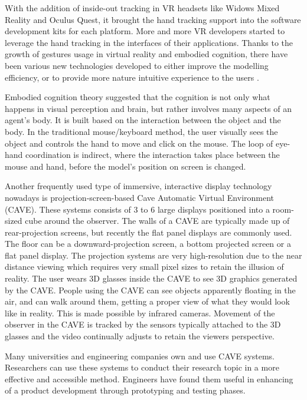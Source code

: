 With the addition of inside-out tracking in VR headsets like Widows Mixed Reality and Oculus Quest, it brought the hand tracking support into the software development kits for each platform. More and more VR developers started to leverage the hand tracking in the interfaces of their applications. Thanks to the growth of gestures usage in virtual reality and embodied cognition, there have been various new technologies developed to either improve the modelling efficiency, or to provide more nature intuitive experience to the users \citep{dangetiComparingBarehandinairGesture2016}.

Embodied cognition theory suggested that the cognition is not only what happens in visual perception and brain, but rather involves many aspects of an agent’s body. It is built based on the interaction between the object and the body. In the traditional mouse/keyboard method, the user visually sees the object and controls the hand to move and click on the mouse. The loop of eye-hand coordination is indirect, where the interaction takes place between the mouse and hand, before the model’s position on screen is changed.

Another frequently used type of immersive, interactive display technology nowadays is projection-screen-based Cave Automatic Virtual Environment (CAVE). These systems consists of 3 to 6 large displays positioned into a room-sized cube around the observer. The walls of a CAVE are typically made up of rear-projection screens, but recently the flat panel displays are commonly used. The floor can be a downward-projection screen, a bottom projected screen or a flat panel display. The projection systems are very high-resolution due to the near distance viewing which requires very small pixel sizes to retain the illusion of reality. The user wears 3D glasses inside the CAVE to see 3D graphics generated by the CAVE. People using the CAVE can see objects apparently floating in the air, and can walk around them, getting a proper view of what they would look like in reality. This is made possible by infrared cameras. Movement of the observer in the CAVE is tracked by the sensors typically attached to the 3D glasses and the video continually adjusts to retain the viewers perspective.

Many universities and engineering companies own and use CAVE systems. Researchers can use these systems to conduct their research topic in a more effective and accessible method. Engineers have found them useful in enhancing of a product development through prototyping and testing phases.

